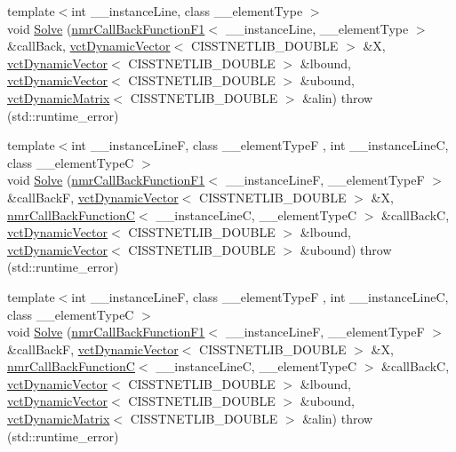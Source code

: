 \begin{DoxyCompactItemize}
\item 
{\footnotesize template$<$int \-\_\-\-\_\-instance\-Line, class \-\_\-\-\_\-element\-Type $>$ }\\void \hyperlink{classnmr_fmin_solver_aa00f3effd7a544f2c83c3ee4be93e4c0}{Solve} (\hyperlink{classnmr_call_back_function_f1}{nmr\-Call\-Back\-Function\-F1}$<$ \-\_\-\-\_\-instance\-Line, \-\_\-\-\_\-element\-Type $>$ \&call\-Back, \hyperlink{classvct_dynamic_vector}{vct\-Dynamic\-Vector}$<$ C\-I\-S\-S\-T\-N\-E\-T\-L\-I\-B\-\_\-\-D\-O\-U\-B\-L\-E $>$ \&X, \hyperlink{classvct_dynamic_vector}{vct\-Dynamic\-Vector}$<$ C\-I\-S\-S\-T\-N\-E\-T\-L\-I\-B\-\_\-\-D\-O\-U\-B\-L\-E $>$ \&lbound, \hyperlink{classvct_dynamic_vector}{vct\-Dynamic\-Vector}$<$ C\-I\-S\-S\-T\-N\-E\-T\-L\-I\-B\-\_\-\-D\-O\-U\-B\-L\-E $>$ \&ubound, \hyperlink{classvct_dynamic_matrix}{vct\-Dynamic\-Matrix}$<$ C\-I\-S\-S\-T\-N\-E\-T\-L\-I\-B\-\_\-\-D\-O\-U\-B\-L\-E $>$ \&alin)  throw (std\-::runtime\-\_\-error)
\item 
{\footnotesize template$<$int \-\_\-\-\_\-instance\-Line\-F, class \-\_\-\-\_\-element\-Type\-F , int \-\_\-\-\_\-instance\-Line\-C, class \-\_\-\-\_\-element\-Type\-C $>$ }\\void \hyperlink{classnmr_fmin_solver_a4f06efc7c3e335a02609a459904883fb}{Solve} (\hyperlink{classnmr_call_back_function_f1}{nmr\-Call\-Back\-Function\-F1}$<$ \-\_\-\-\_\-instance\-Line\-F, \-\_\-\-\_\-element\-Type\-F $>$ \&call\-Back\-F, \hyperlink{classvct_dynamic_vector}{vct\-Dynamic\-Vector}$<$ C\-I\-S\-S\-T\-N\-E\-T\-L\-I\-B\-\_\-\-D\-O\-U\-B\-L\-E $>$ \&X, \hyperlink{classnmr_call_back_function_c}{nmr\-Call\-Back\-Function\-C}$<$ \-\_\-\-\_\-instance\-Line\-C, \-\_\-\-\_\-element\-Type\-C $>$ \&call\-Back\-C, \hyperlink{classvct_dynamic_vector}{vct\-Dynamic\-Vector}$<$ C\-I\-S\-S\-T\-N\-E\-T\-L\-I\-B\-\_\-\-D\-O\-U\-B\-L\-E $>$ \&lbound, \hyperlink{classvct_dynamic_vector}{vct\-Dynamic\-Vector}$<$ C\-I\-S\-S\-T\-N\-E\-T\-L\-I\-B\-\_\-\-D\-O\-U\-B\-L\-E $>$ \&ubound)  throw (std\-::runtime\-\_\-error)
\item 
{\footnotesize template$<$int \-\_\-\-\_\-instance\-Line\-F, class \-\_\-\-\_\-element\-Type\-F , int \-\_\-\-\_\-instance\-Line\-C, class \-\_\-\-\_\-element\-Type\-C $>$ }\\void \hyperlink{classnmr_fmin_solver_a116bcd32c227c99f1956bbe8b2486827}{Solve} (\hyperlink{classnmr_call_back_function_f1}{nmr\-Call\-Back\-Function\-F1}$<$ \-\_\-\-\_\-instance\-Line\-F, \-\_\-\-\_\-element\-Type\-F $>$ \&call\-Back\-F, \hyperlink{classvct_dynamic_vector}{vct\-Dynamic\-Vector}$<$ C\-I\-S\-S\-T\-N\-E\-T\-L\-I\-B\-\_\-\-D\-O\-U\-B\-L\-E $>$ \&X, \hyperlink{classnmr_call_back_function_c}{nmr\-Call\-Back\-Function\-C}$<$ \-\_\-\-\_\-instance\-Line\-C, \-\_\-\-\_\-element\-Type\-C $>$ \&call\-Back\-C, \hyperlink{classvct_dynamic_vector}{vct\-Dynamic\-Vector}$<$ C\-I\-S\-S\-T\-N\-E\-T\-L\-I\-B\-\_\-\-D\-O\-U\-B\-L\-E $>$ \&lbound, \hyperlink{classvct_dynamic_vector}{vct\-Dynamic\-Vector}$<$ C\-I\-S\-S\-T\-N\-E\-T\-L\-I\-B\-\_\-\-D\-O\-U\-B\-L\-E $>$ \&ubound, \hyperlink{classvct_dynamic_matrix}{vct\-Dynamic\-Matrix}$<$ C\-I\-S\-S\-T\-N\-E\-T\-L\-I\-B\-\_\-\-D\-O\-U\-B\-L\-E $>$ \&alin)  throw (std\-::runtime\-\_\-error)

\end{DoxyCompactItemize}
